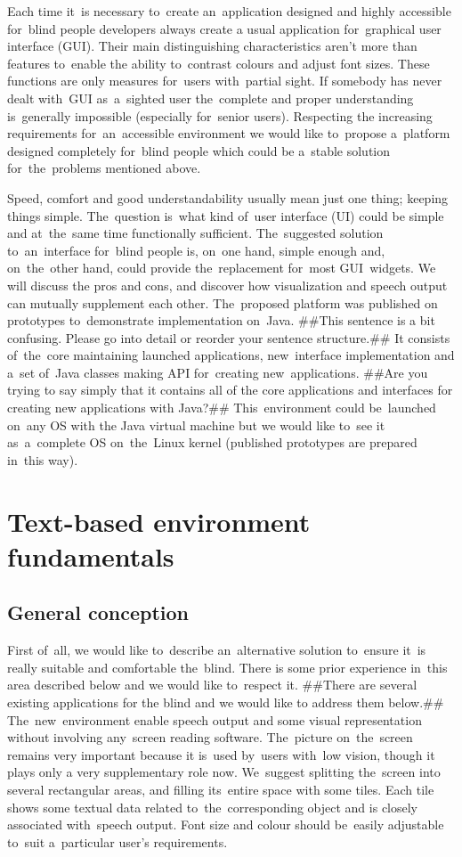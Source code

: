 \documentclass{acm_proc_article-sp}
\begin{document}
Each time it~is necessary to~create an~application designed and highly accessible for~blind people 
developers always create a usual application for~graphical user interface (GUI).
Their main distinguishing characteristics aren't more than 
features to~enable the ability to~contrast colours and adjust font sizes.
These functions are only measures for~users with~partial sight.
If somebody has never dealt with~GUI as~a~sighted user   
the~complete and proper understanding is~generally impossible (especially for~senior users).
Respecting the increasing requirements for~an~accessible environment we would  like to~propose 
a~platform designed completely for~blind people 
which could be a~stable solution for~the~problems mentioned above.

Speed, comfort and good understandability  usually mean just one thing; keeping things simple.
The~question is~what kind of~user interface (UI) could be  simple and at~the~same time functionally sufficient.
The~suggested solution to~an~interface for~blind  people
is, on~one hand, simple enough and, on~the~other hand,
could provide  the~replacement for~most GUI~widgets.
We will discuss the pros and cons, 
and discover how visualization and speech output can mutually supplement each other.
The~proposed platform was published on prototypes to~demonstrate 
implementation on~Java. ##This sentence is a bit confusing. Please go into detail or reorder your sentence structure.##
It consists of~the~core maintaining launched applications,
new~interface implementation and a~set of~Java classes making API for~creating new~applications.
##Are you trying to say simply that it contains all of the core applications and interfaces for creating new applications with Java?##
This~environment could be~launched on~any OS with the Java virtual machine 
but we would like to~see it as~a~complete OS on~the~Linux kernel 
(published prototypes are prepared in~this way).

\section{Text-based environment fundamentals}
\subsection{General conception}

First of~all, we would like to~describe an~alternative solution  
to~ensure it~is really suitable and comfortable the~blind.
There is some prior experience in~this area described below and we would like   to~respect it.
##There are several existing applications for the blind and we would like to address them below.##
The~new~environment enable speech output and some visual representation 
without involving any~screen reading software.
The~picture on~the~screen remains very important because it is~used by~users with~low vision, 
though it plays only a very supplementary role now.
We~suggest splitting the~screen into several rectangular areas, 
and filling its~entire space with some tiles. 
Each tile shows some textual data related to~the~corresponding object 
and is closely associated with~speech output.
Font size and colour should be~easily adjustable to~suit a~particular user's requirements.
\end{document}
